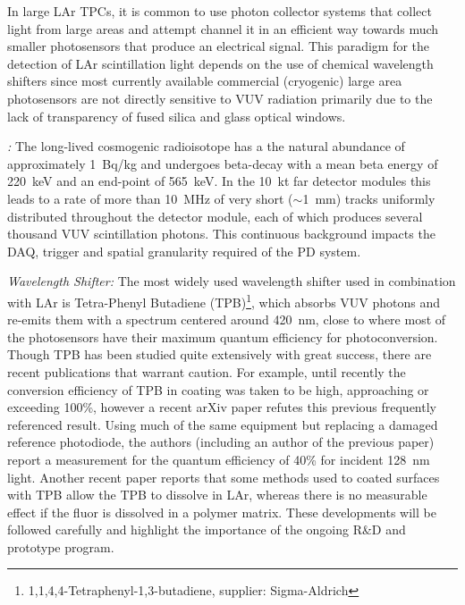In large LAr TPCs, it is common to use photon collector systems that collect light from large areas and attempt channel it in an efficient way towards much smaller photosensors that produce an electrical signal.
This paradigm for the detection of LAr scintillation light depends on the use of chemical wavelength shifters since most currently available commercial (cryogenic) large area photosensors are not directly sensitive to VUV radiation primarily due to the lack of transparency of fused silica and glass optical windows. 

\emph{:}  The long-lived cosmogenic radioisotope  has a the natural abundance of approximately \SI{1}{Bq/kg} and
undergoes beta-decay with a mean beta energy of \SI{220}{keV} and an end-point of \SI{565}{keV}. In the \SI{10}{kt} far detector modules this leads to a rate of more than \SI{10}{MHz} of very short ($\sim$\SI{1}{mm}) tracks uniformly distributed throughout the detector module, each of which produces several thousand VUV scintillation photons. This continuous background impacts the DAQ, trigger and spatial granularity required of the PD system.

\emph{Wavelength Shifter:} The most widely used wavelength shifter used in combination with LAr is Tetra-Phenyl Butadiene (TPB)\footnote{1,1,4,4-Tetraphenyl-1,3-butadiene, supplier: Sigma-Aldrich\textregistered}, which absorbs VUV photons and re-emits them with a spectrum centered around \SI{420}{nm}, close to where most of the photosensors have their maximum quantum efficiency for photoconversion. 
Though TPB has been studied quite extensively with great success, there are recent publications that warrant caution. For example, until recently the conversion efficiency of TPB in coating was taken to be high, approaching or exceeding 100\%, however a recent arXiv paper\cite{Benson:2017vbw} refutes this previous frequently referenced result. Using much of the same equipment but replacing a damaged reference photodiode, the authors (including an author of the previous paper) report a measurement for the quantum efficiency of 40\% for incident \SI{128}{nm} light. 
Another recent paper\cite{Asaadi:2018ixs} reports that some methods used to coated surfaces with TPB allow the TPB to dissolve in LAr, whereas there is no measurable effect if the fluor is dissolved in a polymer matrix. These developments will be followed carefully and highlight the importance of the ongoing R\&D and prototype program.


